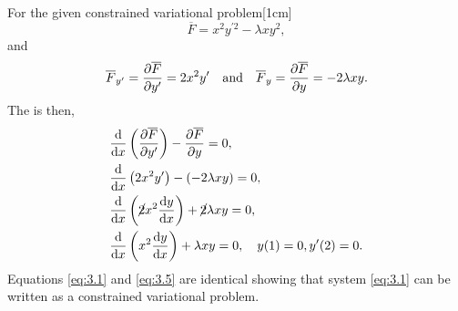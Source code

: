For the given constrained variational problem[1cm]
\[
	\overline{F} = x^2y^{\prime2} - \lambda x y^2,
\]
and
\[
	\overline{F}_{y^\prime} = \frac{\partial \overline{F}}{\partial y^\prime}= 2x^2y^\prime\quad\text{and}\quad \overline{F}_y =\frac{\partial \overline{F}}{\partial y}= -2\lambda x y.
\]
The \el is then,
\begin{align}
\label{eq:3.5}
	&\frac{\mathrm{d}}{\mathrm{d}x}\left(\frac{\partial \overline{F}}{\partial y^\prime}\right) - \frac{\partial \overline{F}}{\partial y} = 0,\nonumber\\
	&\frac{\mathrm{d}}{\mathrm{d}x}\left(2x^2y^\prime\right) - \left(-2\lambda x y\right)= 0,\nonumber\\
	&\frac{\mathrm{d}}{\mathrm{d}x}\left(\cancel{2}x^2\frac{\mathrm{d}y}{\mathrm{d}x}\right) + \cancel{2}\lambda x y= 0,\nonumber\\
	&\frac{\mathrm{d}}{\mathrm{d}x}\left(x^2\frac{\mathrm{d}y}{\mathrm{d}x}\right) + \lambda x y= 0,\quad y(1)=0, y^\prime(2)=0.
\end{align}
Equations \eqref{eq:3.1} and \eqref{eq:3.5} are identical showing that system \eqref{eq:3.1} can be written as a constrained variational problem.
	
